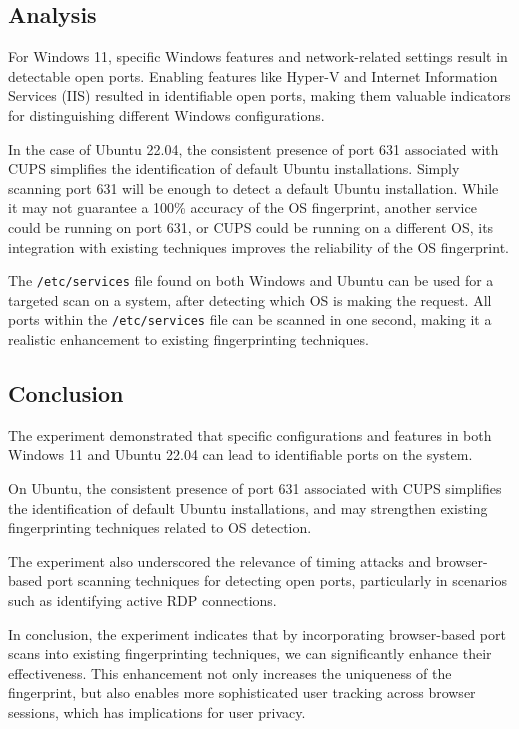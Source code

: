 \subsection{Analysis}

For Windows 11, specific Windows features and network-related settings result in detectable open ports. Enabling features like Hyper-V and Internet Information Services (IIS) resulted in identifiable open ports, making them valuable indicators for distinguishing different Windows configurations. 

In the case of Ubuntu 22.04, the consistent presence of port 631 associated with CUPS simplifies the identification of default Ubuntu installations. 
Simply scanning port 631 will be enough to detect a default Ubuntu installation. While it may not guarantee a 100\% accuracy of the OS fingerprint, another service could be running on port 631, or CUPS could be running on a different OS, its integration with existing techniques improves the reliability of the OS fingerprint. 

The \texttt{/etc/services} file found on both Windows and Ubuntu can be used for a targeted scan on a system, after detecting which OS is making the request. All ports within the \texttt{/etc/services} file can be scanned in one second, making it a realistic enhancement to existing fingerprinting techniques.  

\subsection{Conclusion}

The experiment demonstrated that specific configurations and features in both Windows 11 and Ubuntu 22.04 can lead to identifiable ports on the system.

On Ubuntu, the consistent presence of port 631 associated with CUPS simplifies the identification of default Ubuntu installations, and may strengthen existing fingerprinting techniques related to OS detection.

The experiment also underscored the relevance of timing attacks and browser-based port scanning techniques for detecting open ports, particularly in scenarios such as identifying active RDP connections.

In conclusion, the experiment indicates that by incorporating browser-based port scans into existing fingerprinting techniques, we can significantly enhance their effectiveness. This enhancement not only increases the uniqueness of the fingerprint, but also enables more sophisticated user tracking across browser sessions, which has implications for user privacy.

